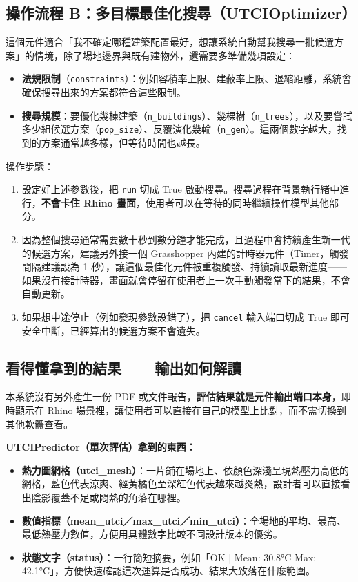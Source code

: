 \subsection{操作流程 B：多目標最佳化搜尋（UTCIOptimizer）}
\label{appx:user_manual_optimize}

這個元件適合「我不確定哪種建築配置最好，想讓系統自動幫我搜尋一批候選方案」的情境，除了場地邊界與既有建物外，還需要多準備幾項設定：

\begin{itemize}
    \item \textbf{法規限制}（\texttt{constraints}）：例如容積率上限、建蔽率上限、退縮距離，系統會確保搜尋出來的方案都符合這些限制。
    \item \textbf{搜尋規模}：要優化幾棟建築（\texttt{n\_buildings}）、幾棵樹（\texttt{n\_trees}），以及要嘗試多少組候選方案（\texttt{pop\_size}）、反覆演化幾輪（\texttt{n\_gen}）。這兩個數字越大，找到的方案通常越多樣，但等待時間也越長。
\end{itemize}

操作步驟：

\begin{enumerate}
    \item 設定好上述參數後，把 \texttt{run} 切成 True 啟動搜尋。搜尋過程在背景執行緒中進行，\textbf{不會卡住 Rhino 畫面}，使用者可以在等待的同時繼續操作模型其他部分。
    \item 因為整個搜尋通常需要數十秒到數分鐘才能完成，且過程中會持續產生新一代的候選方案，建議另外接一個 Grasshopper 內建的計時器元件（Timer，觸發間隔建議設為 1 秒），讓這個最佳化元件被重複觸發、持續讀取最新進度——如果沒有接計時器，畫面就會停留在使用者上一次手動觸發當下的結果，不會自動更新。
    \item 如果想中途停止（例如發現參數設錯了），把 \texttt{cancel} 輸入端口切成 True 即可安全中斷，已經算出的候選方案不會遺失。
\end{enumerate}

\subsection{看得懂拿到的結果——輸出如何解讀}
\label{appx:user_manual_output}

本系統沒有另外產生一份 PDF 或文件報告，\textbf{評估結果就是元件輸出端口本身}，即時顯示在 Rhino 場景裡，讓使用者可以直接在自己的模型上比對，而不需切換到其他軟體查看。

\textbf{UTCIPredictor（單次評估）拿到的東西：}

\begin{itemize}
    \item \textbf{熱力圖網格（utci\_mesh）}：一片鋪在場地上、依顏色深淺呈現熱壓力高低的網格，藍色代表涼爽、經黃橘色至深紅色代表越來越炎熱，設計者可以直接看出陰影覆蓋不足或悶熱的角落在哪裡。
    \item \textbf{數值指標（mean\_utci／max\_utci／min\_utci）}：全場地的平均、最高、最低熱壓力數值，方便用具體數字比較不同設計版本的優劣。
    \item \textbf{狀態文字（status）}：一行簡短摘要，例如「OK | Mean: 30.8°C  Max: 42.1°C」，方便快速確認這次運算是否成功、結果大致落在什麼範圍。
\end{itemize}

